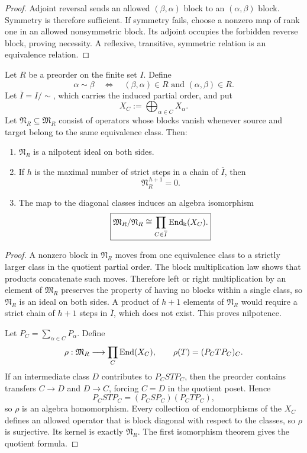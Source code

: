 \begin{proof}
Adjoint reversal sends an allowed $(\beta,\alpha)$ block to an $(\alpha,\beta)$ block.  Symmetry is therefore sufficient.  If symmetry fails, choose a nonzero map of rank one in an allowed nonsymmetric block.  Its adjoint occupies the forbidden reverse block, proving necessity.  A reflexive, transitive, symmetric relation is an equivalence relation.
\end{proof}

\begin{theorem}
\label{thm:preorder-decomposition}
Let $R$ be a preorder on the finite set $I$.  Define
\[
\alpha\sim\beta
\quad\Longleftrightarrow\quad
(\beta,\alpha)\in R\text{ and }(\alpha,\beta)\in R.
\]
Let $\overline I=I/{\sim}$, which carries the induced partial order, and put
\[
X_C:=\bigoplus_{\alpha\in C}X_\alpha.
\]
Let $\mathfrak N_R\subseteq\mathfrak M_R$ consist of operators whose blocks vanish whenever source and target belong to the same equivalence class.  Then:
\begin{enumerate}[label=(\roman*)]
\item $\mathfrak N_R$ is a nilpotent ideal on both sides.
\item If $h$ is the maximal number of strict steps in a chain of $\overline I$, then
\[
\mathfrak N_R^{\,h+1}=0.
\]
\item The map to the diagonal classes induces an algebra isomorphism
\[
\boxed{
\mathfrak M_R/\mathfrak N_R
\cong
\prod_{C\in\overline I}\operatorname{End}_{\Bbbk}(X_C).
}
\]
\end{enumerate}
\end{theorem}

\begin{proof}
A nonzero block in $\mathfrak N_R$ moves from one equivalence class to a strictly larger class in the quotient partial order.  The block multiplication law shows that products concatenate such moves.  Therefore left or right multiplication by an element of $\mathfrak M_R$ preserves the property of having no blocks within a single class, so $\mathfrak N_R$ is an ideal on both sides.  A product of $h+1$ elements of $\mathfrak N_R$ would require a strict chain of $h+1$ steps in $\overline I$, which does not exist.  This proves nilpotence.

Let $P_C=\sum_{\alpha\in C}P_\alpha$.  Define
\[
\rho:\mathfrak M_R\longrightarrow\prod_C\operatorname{End}(X_C),
\qquad
\rho(T)=(P_CTP_C)_C.
\]
If an intermediate class $D$ contributes to $P_CSTP_C$, then the preorder contains transfers $C\to D$ and $D\to C$, forcing $C=D$ in the quotient poset.  Hence
\[
P_CSTP_C=(P_CSP_C)(P_CTP_C),
\]
so $\rho$ is an algebra homomorphism.  Every collection of endomorphisms of the $X_C$ defines an allowed operator that is block diagonal with respect to the classes, so $\rho$ is surjective.  Its kernel is exactly $\mathfrak N_R$.  The first isomorphism theorem gives the quotient formula.
\end{proof}

